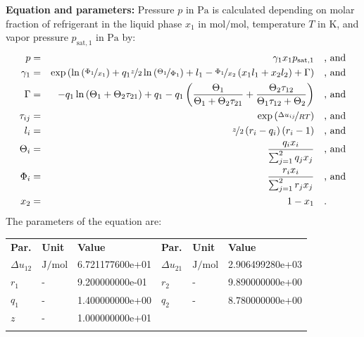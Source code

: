 \textbf{Equation and parameters:}
\newline
%
Pressure $p$ in $\si{\pascal}$ is calculated depending on molar fraction of refrigerant in the liquid phase $x_1$ in $\si{\mole\per\mole}$, temperature $T$ in $\si{\kelvin}$, and vapor pressure $p_\mathrm{sat,1}$ in $\si{\pascal}$ by:
%
\begin{equation*}
\begin{split}
p &=& \gamma_1 x_1 p_\mathrm{sat,1} & \quad\text{, and} \\
\gamma_1 &=& \exp \left( \ln \left( \nicefrac{\Phi_1}{x_1} \right) + q_1 \nicefrac{z}{2} \ln \left( \nicefrac{\Theta_1}{\Phi_1} \right) + l_1 - \nicefrac{\Phi_1}{x_2} \left( x_1 l_1 + x_2 l_2 \right) + \Gamma \right) & \quad\text{, and} \\
\Gamma &=& - q_1 \ln \left( \Theta_1 + \Theta_2 \tau_{21} \right) + q_1 - q_1 \left( \frac{\Theta_1}{\Theta_1 + \Theta_2 \tau_{21}} + \frac{\Theta_2 \tau_{12}}{\Theta_1 \tau_{12} + \Theta_2} \right) & \quad\text{, and} \\
\tau_{ij} &=& \exp \left( \nicefrac{\Delta u_{ij}}{R T} \right) & \quad\text{, and} \\
l_i &=& \nicefrac{z}{2} \left( r_i - q_i \right) \left(r_i - 1 \right) & \quad\text{, and} \\
\Theta_i &=& \frac{q_i x_i}{\sum_{j=1}^{2} q_j x_j} & \quad\text{, and} \\
\Phi_i &=& \frac{r_i x_i}{\sum_{j=1}^{2} r_j x_j} & \quad\text{, and} \\
x_2 &=& 1 - x_1  & \quad\text{.} \\
\end{split}
\end{equation*}
%
The parameters of the equation are:
%
\begin{longtable}[l]{lll|lll}
\toprule
\addlinespace
\textbf{Par.} & \textbf{Unit} & \textbf{Value} &	\textbf{Par.} & \textbf{Unit} & \textbf{Value} \\
\addlinespace
\midrule
\endhead

\bottomrule
\endfoot
\bottomrule
\endlastfoot
\addlinespace

$\Delta u_{12}$ & $\si{\joule\per\mole}$ & 6.721177600e+01 & $\Delta u_{21}$ & $\si{\joule\per\mole}$ & 2.906499280e+03 \\
$r_{1}$ & - & 9.200000000e-01 & $r_{2}$ & - & 9.890000000e+00 \\
$q_{1}$ & - & 1.400000000e+00 & $q_{2}$ & - & 8.780000000e+00 \\
$z$ & - & 1.000000000e+01 & & &  \\

\addlinespace\end{longtable}

